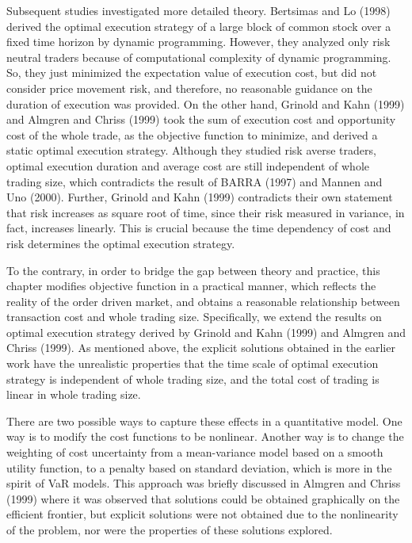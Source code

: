 Subsequent studies investigated more detailed theory.  Bertsimas and Lo (1998) derived the optimal execution strategy of a large block of common stock over a fixed time horizon by dynamic programming.  However, they analyzed only risk neutral traders because of computational complexity of dynamic programming.  So, they just minimized the expectation value of execution cost, but did not consider price movement risk, and therefore, no reasonable guidance on the duration of execution was provided.  On the other hand, Grinold and Kahn (1999) and Almgren and Chriss (1999) took the sum of execution cost and opportunity cost of the whole trade, as the objective function to minimize, and derived a static optimal execution strategy.  Although they studied risk averse traders, optimal execution duration and average cost are still independent of whole trading size, which contradicts the result of BARRA (1997) and Mannen and Uno (2000).  Further, Grinold and Kahn (1999) contradicts their own statement that risk increases as square root of time, since their risk measured in variance, in fact, increases linearly.  This is crucial because the time dependency of cost and risk determines the optimal execution strategy.

 To the contrary, in order to bridge the gap between theory and practice, this chapter modifies objective function in a practical manner, which reflects the reality of the order driven market, and obtains a reasonable relationship between transaction cost and whole trading size.  Specifically, we extend the results on optimal execution strategy derived by Grinold and Kahn (1999) and Almgren and Chriss (1999).  As mentioned above, the explicit solutions obtained in the earlier work have the unrealistic properties that the time scale of optimal execution strategy is independent of whole trading size, and the total cost of trading is linear in whole trading size. 

There are two possible ways to capture these effects in a quantitative model. One way is to modify the cost functions to be nonlinear.  Another way is to change the weighting of cost uncertainty from a mean-variance model based on a smooth utility function, to a penalty based on standard deviation, which is more in the spirit of VaR models.  This approach was briefly discussed in Almgren and Chriss (1999) where it was observed that solutions could be obtained graphically on the efficient frontier, but explicit solutions were not obtained due to the nonlinearity of the problem, nor were the properties of these solutions explored.

